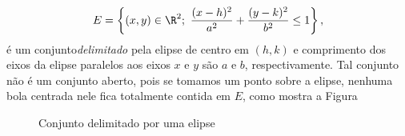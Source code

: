 \[E=\left\{(x,y)\in\R^2;~ \frac{{(x-h)^2}}{{a^2}} + \frac{{(y-k)^2}}{{b^2}} \leq 1\right\},\]
é um conjunto\textit{delimitado} pela elipse de centro em \((h, k)\) e  comprimento dos eixos da elipse paralelos aos eixos \(x\) e \(y\) são \(a\) e \(b\), respectivamente. 
Tal conjunto não é um conjunto aberto, pois se tomamos um ponto sobre a elipse, nenhuma bola centrada nele fica totalmente contida em $E$, como mostra a Figura
\begin{figure}[H]
    \centering
{}
    \caption{Conjunto delimitado por uma elipse}
    \label{fig:2-elipse}
  \end{figure}




